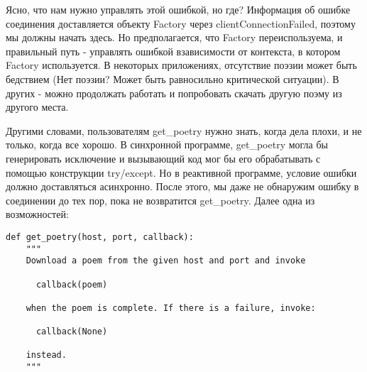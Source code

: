 
Ясно, что нам нужно управлять этой ошибкой, но где? 
Информация об ошибке соединения доставляется объекту 
Factory через clientConnectionFailed, поэтому мы должны 
начать здесь. Но предполагается, что Factory переиспользуема, и 
правильный путь - управлять ошибкой взависимости от контекста, 
в котором Factory используется. В некоторых приложениях, 
отсутствие поэзии может быть бедствием (Нет поэзии? Может быть равносильно 
критической ситуации). В других - можно продолжать работать и попробовать 
скачать другую поэму из другого места.   


Другими словами, пользователям get\_poetry нужно 
знать, когда дела плохи, и не только, когда все хорошо. 
В синхронной программе, get\_poetry могла бы генерировать 
исключение и вызывающий код мог бы его обрабатывать с 
помощью конструкции try/except. Но в реактивной программе, 
условие ошибки должно доставляться асинхронно. После этого, 
мы даже не обнаружим ошибку в соединении до тех пор, пока 
не возвратится get\_poetry. Далее одна из возможностей:

 \begin{verbatim}
def get_poetry(host, port, callback):
    """
    Download a poem from the given host and port and invoke

      callback(poem)

    when the poem is complete. If there is a failure, invoke:

      callback(None)

    instead.
    """
\end{verbatim} 

